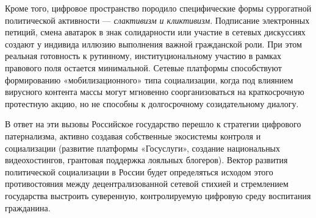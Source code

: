 Кроме того, цифровое пространство породило специфические формы суррогатной политической активности — \textit{слактивизм и кликтивизм}. Подписание электронных петиций, смена аватарок в знак солидарности или участие в сетевых дискуссиях создают у индивида иллюзию выполнения важной гражданской роли. При этом реальная готовность к рутинному, институциональному участию в рамках правового поля остается минимальной. Сетевые платформы способствуют формированию «мобилизационного» типа социализации, когда под влиянием вирусного контента массы могут мгновенно соорганизоваться на краткосрочную протестную акцию, но не способны к долгосрочному созидательному диалогу. 

В ответ на эти вызовы Российское государство перешло к стратегии цифрового патернализма, активно создавая собственные экосистемы контроля и социализации (развитие платформы «Госуслуги», создание национальных видеохостингов, грантовая поддержка лояльных блогеров). Вектор развития политической социализации в России будет определяться исходом этого противостояния между децентрализованной сетевой стихией и стремлением государства выстроить суверенную, контролируемую цифровую среду воспитания гражданина.